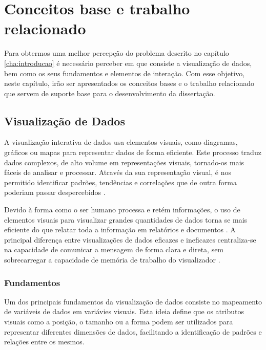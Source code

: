 
%

\chapter{Conceitos base e trabalho relacionado}
\label{cha:conceitos_base}

Para obtermos uma melhor percepção do problema descrito no capítulo \ref{cha:introducao} é necessário perceber em que consiste a visualização de dados, bem como os seus fundamentos e elementos de interação.
Com esse objetivo, neste capítulo, irão ser apresentados os conceitos bases e o trabalho relacionado que servem de suporte base para o desenvolvimento da dissertação.

\section{Visualização de Dados}
\label{sec:vis_dados}

A visualização interativa de dados usa elementos visuais, como diagramas, gráficos ou mapas para representar dados de forma eficiente. Este processo traduz dados complexos, de alto volume em representações visuais, tornado-os mais fáceis de analisar e processar. Através da sua representação visual, é nos permitido identificar padrões, tendências e correlações que de outra forma poderiam passar despercebidos \cite{keim2002information}.

Devido à forma como o ser humano processa e retém informações, o uso de elementos visuais para visualizar grandes quantidades de dados torna se mais eficiente do que relatar toda a informação em relatórios e documentos \cite{ware2019information}. A principal diferença entre visualizações de dados eficazes e ineficazes centraliza-se na capacidade de comunicar a mensagem de forma clara e direta, sem sobrecarregar a capacidade de memória de trabalho do visualizador \cite{evergreen2013design}.

\subsection{Fundamentos} %
\label{sub:fundamentos}

Um dos principais fundamentos da visualização de dados consiste no mapeamento de variáveis de dados em variávies visuais. Esta ideia define que os atributos visuais como a posição, o tamanho ou a forma podem ser utilizados para representar diferentes dimensões de dados, facilitando a identificação de padrões e relações entre os mesmos.

